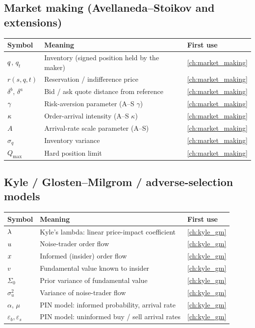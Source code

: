 \subsection{Market making (Avellaneda--Stoikov and extensions)}

\begin{longtable}{@{}l >{\raggedright\arraybackslash}p{} l@{}}
\toprule
\textbf{Symbol} & \textbf{Meaning} & \textbf{First use} \\
\midrule
\endhead
$q$, $q_t$ & Inventory (signed position held by the maker) & \cref{ch:market_making} \\
$r(s,q,t)$ & Reservation / indifference price & \cref{ch:market_making} \\
$\delta^b$, $\delta^a$ & Bid / ask quote distance from reference & \cref{ch:market_making} \\
$\gamma$ & Risk-aversion parameter (A--S $\gamma$) & \cref{ch:market_making} \\
$\kappa$ & Order-arrival intensity (A--S $\kappa$) & \cref{ch:market_making} \\
$A$ & Arrival-rate scale parameter (A--S) & \cref{ch:market_making} \\
$\sigma_q$ & Inventory variance & \cref{ch:market_making} \\
$Q_{\max}$ & Hard position limit & \cref{ch:market_making} \\
\bottomrule
\end{longtable}

\subsection{Kyle / Glosten--Milgrom / adverse-selection models}

\begin{longtable}{@{}l >{\raggedright\arraybackslash}p{} l@{}}
\toprule
\textbf{Symbol} & \textbf{Meaning} & \textbf{First use} \\
\midrule
\endhead
$\lambda$ & Kyle's lambda: linear price-impact coefficient & \cref{ch:kyle_gm} \\
$u$ & Noise-trader order flow & \cref{ch:kyle_gm} \\
$x$ & Informed (insider) order flow & \cref{ch:kyle_gm} \\
$v$ & Fundamental value known to insider & \cref{ch:kyle_gm} \\
$\Sigma_0$ & Prior variance of fundamental value & \cref{ch:kyle_gm} \\
$\sigma_u^2$ & Variance of noise-trader flow & \cref{ch:kyle_gm} \\
$\alpha$, $\mu$ & PIN model: informed probability, arrival rate & \cref{ch:kyle_gm} \\
$\varepsilon_b, \varepsilon_s$ & PIN model: uninformed buy / sell arrival rates & \cref{ch:kyle_gm} \\
\bottomrule
\end{longtable}

